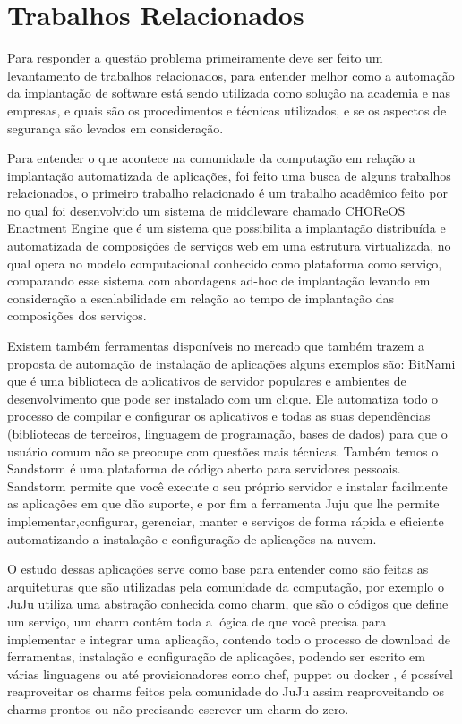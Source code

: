 \section{Trabalhos Relacionados}

Para responder a questão problema primeiramente deve ser feito um levantamento
de trabalhos relacionados, para entender melhor como a automação da implantação
de software está sendo utilizada como solução na academia e nas empresas, e
quais são os procedimentos e técnicas utilizados, e se os aspectos de segurança
são levados em consideração.

Para entender o que acontece na comunidade da computação em relação a implantação
automatizada de aplicações, foi feito uma busca de alguns trabalhos relacionados, o primeiro
trabalho relacionado é um trabalho acadêmico feito por \cite{leo2014} no qual foi
desenvolvido um sistema de middleware chamado CHOReOS Enactment Engine que é um
sistema que possibilita a implantação distribuída e automatizada de composições
de serviços web em uma estrutura virtualizada, no qual opera no modelo
computacional conhecido como plataforma como serviço, comparando esse sistema
com abordagens ad-hoc de implantação levando em consideração a escalabilidade
em relação ao tempo de implantação das composições dos serviços.

Existem também ferramentas disponíveis no mercado que também trazem a proposta
de automação de instalação de aplicações alguns exemplos são: \cite{bitnami}
BitNami que é uma biblioteca de aplicativos de servidor populares e ambientes de
desenvolvimento que pode ser instalado com um clique. Ele automatiza todo o
processo de compilar e configurar os aplicativos e todas as suas dependências
(bibliotecas de terceiros, linguagem de programação, bases de dados) para que o
usuário comum não se preocupe com questões mais técnicas. Também temos o
\cite{sandstormio} Sandstorm é uma plataforma de código aberto para servidores
pessoais. Sandstorm permite que você execute o seu próprio servidor e instalar
facilmente as aplicações em que dão suporte, e por fim a ferramenta \cite{juju}
Juju que lhe permite implementar,configurar, gerenciar, manter e serviços de forma
rápida e eficiente automatizando a instalação e configuração de aplicações na nuvem.

O estudo dessas aplicações serve como base para entender como são feitas as
arquiteturas que são utilizadas pela comunidade da computação, por exemplo o JuJu
utiliza uma abstração conhecida como charm, que são o códigos que define um serviço,
um charm contém toda a lógica de que você precisa para implementar e integrar uma
aplicação, contendo todo o processo de download de ferramentas, instalação e configuração
de aplicações, podendo ser escrito
em várias linguagens ou até provisionadores como chef, puppet ou docker \cite{juju}, é
possível reaproveitar os charms feitos pela comunidade do JuJu assim reaproveitando
os charms prontos ou não precisando escrever um charm do zero.


